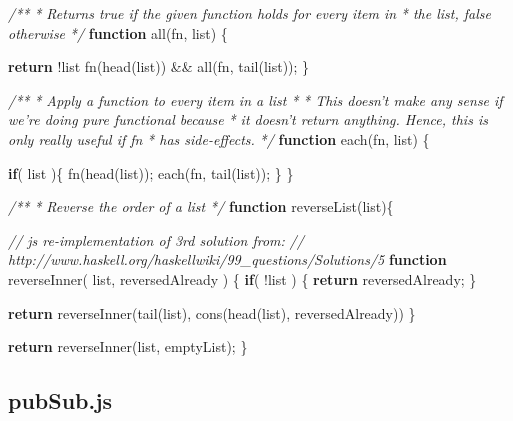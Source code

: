 \documentclass[]{article}
\newenvironment{Shaded}{}{}
\newcommand{\KeywordTok}[1]{\textcolor[rgb]{0.00,0.44,0.13}{\textbf{{#1}}}}
\newcommand{\CommentTok}[1]{\textcolor[rgb]{0.38,0.63,0.69}{\textit{{#1}}}}
\newcommand{\FunctionTok}[1]{\textcolor[rgb]{0.02,0.16,0.49}{{#1}}}
\newcommand{\NormalTok}[1]{{#1}}
\begin{document}
\begin{Shaded}
\begin{Highlighting}[]
\CommentTok{/** }
\CommentTok{ * Returns true if the given function holds for every item in }
\CommentTok{ * the list, false otherwise }
\CommentTok{ */}
\KeywordTok{function} \FunctionTok{all}\NormalTok{(fn, list) \{}
   
   \KeywordTok{return} \NormalTok{!list \textbar{}\textbar{} }
          \FunctionTok{fn}\NormalTok{(}\FunctionTok{head}\NormalTok{(list)) && }\FunctionTok{all}\NormalTok{(fn, }\FunctionTok{tail}\NormalTok{(list));}
\NormalTok{\}}

\CommentTok{/**}
\CommentTok{ * Apply a function to every item in a list}
\CommentTok{ * }
\CommentTok{ * This doesn't make any sense if we're doing pure functional because }
\CommentTok{ * it doesn't return anything. Hence, this is only really useful if fn }
\CommentTok{ * has side-effects. }
\CommentTok{ */}
\KeywordTok{function} \FunctionTok{each}\NormalTok{(fn, list) \{}

   \KeywordTok{if}\NormalTok{( list )\{  }
      \FunctionTok{fn}\NormalTok{(}\FunctionTok{head}\NormalTok{(list));}
      \FunctionTok{each}\NormalTok{(fn, }\FunctionTok{tail}\NormalTok{(list));}
   \NormalTok{\}}
\NormalTok{\}}

\CommentTok{/**}
\CommentTok{ * Reverse the order of a list}
\CommentTok{ */}
\KeywordTok{function} \FunctionTok{reverseList}\NormalTok{(list)\{ }

   \CommentTok{// js re-implementation of 3rd solution from:}
   \CommentTok{//    http://www.haskell.org/haskellwiki/99_questions/Solutions/5}
   \KeywordTok{function} \FunctionTok{reverseInner}\NormalTok{( list, reversedAlready ) \{}
      \KeywordTok{if}\NormalTok{( !list ) \{}
         \KeywordTok{return} \NormalTok{reversedAlready;}
      \NormalTok{\}}
      
      \KeywordTok{return} \FunctionTok{reverseInner}\NormalTok{(}\FunctionTok{tail}\NormalTok{(list), }\FunctionTok{cons}\NormalTok{(}\FunctionTok{head}\NormalTok{(list), reversedAlready))}
   \NormalTok{\}}

   \KeywordTok{return} \FunctionTok{reverseInner}\NormalTok{(list, emptyList);}
\NormalTok{\}}
\end{Highlighting}
\end{Shaded}

\pagebreak

\subsection{pubSub.js}

\label{src_pubSub}
\end{document}
